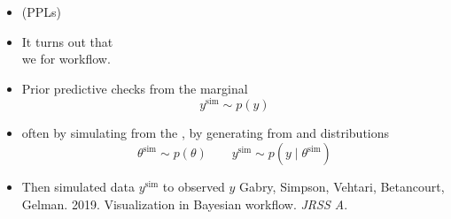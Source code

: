 \documentclass[10pt]{report}
\newcommand{\simvar}[1]{#1^{\textrm{sim}}}
\begin{document}
\begin{itemize}
\item {} (PPLs)
  \vfill
\item It turns out that
  \\
  we  for workflow.
\end{itemize}

\begin{itemize}
\item Prior predictive checks  from the marginal
  \[
    \simvar{y} \sim p(y)
  \]
\item often by simulating from the , by generating from  and  distributions
  \[
    \simvar{\theta} \sim p(\theta)
    \qquad
    \simvar{y} \sim p(y \mid \simvar{\theta})
  \]
\item Then  simulated data $\simvar{y}$ to observed $y$
  \vfill
  {\footnotesize Gabry, Simpson, Vehtari, Betancourt,
    Gelman. 2019. Visualization in Bayesian workflow. \textit{JRSS A}.}
\end{itemize}

\end{document}
